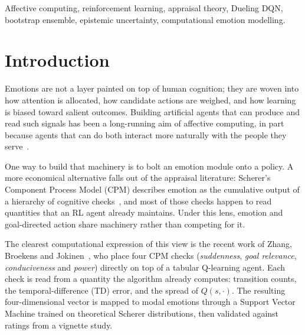 \documentclass[conference]{IEEEtran}
\begin{document}
\begin{abstract}
the appraisal vector reads its uncertainty signal from intra-distribution
spread; we report its numbers honestly alongside the headline configuration
so that the design trade-off is visible to the reader. Two preliminary
configurations explored along the way---Method~1a (a vanilla DQN with a
six-dimensional appraisal vector and a ten-head MLP ensemble) and
Method~2a (a $64$-quantile distributional value head with a calibrated
SVM classifier on a four-dimensional Scherer mapping)---are documented
in full with the empirical evidence that motivated their replacement
by Method~1b and Method~2b respectively. We end with concrete
pointers toward a vignette-grounded extension.
\end{abstract}

\begin{IEEEkeywords}
Affective computing, reinforcement learning, appraisal theory, Dueling DQN,
bootstrap ensemble, epistemic uncertainty, computational emotion modelling.
\end{IEEEkeywords}

\section{Introduction}
\label{sec:intro}

Emotions are not a layer painted on top of human cognition; they are
woven into how attention is allocated, how candidate actions are weighed,
and how learning is biased toward salient outcomes. Building artificial
agents that can produce and read such signals has been a long-running aim
of affective computing, in part because agents that can do both interact
more naturally with the people they serve~\cite{picard1997affective,marsella2009ema}.

One way to build that machinery is to bolt an emotion module onto a
policy. A more economical alternative falls out of the appraisal
literature: Scherer's Component Process Model (CPM) describes emotion as
the cumulative output of a hierarchy of cognitive
checks~\cite{scherer2001appraisal,scherer2009dynamic}, and most of those
checks happen to read quantities that an RL agent already maintains.
Under this lens, emotion and goal-directed action share machinery rather
than competing for it.

The clearest computational expression of this view is the recent work of
Zhang, Broekens and Jokinen~\cite{zhang2023modeling}, who place four CPM
checks (\emph{suddenness}, \emph{goal relevance}, \emph{conduciveness}
and \emph{power}) directly on top of a tabular Q-learning agent. Each
check is read from a quantity the algorithm already computes: transition
counts, the temporal-difference (TD) error, and the spread of
$Q(s,\cdot)$. The resulting four-dimensional vector is mapped to modal
emotions through a Support Vector Machine trained on theoretical Scherer
distributions, then validated against ratings from a vignette study.
\end{document}
